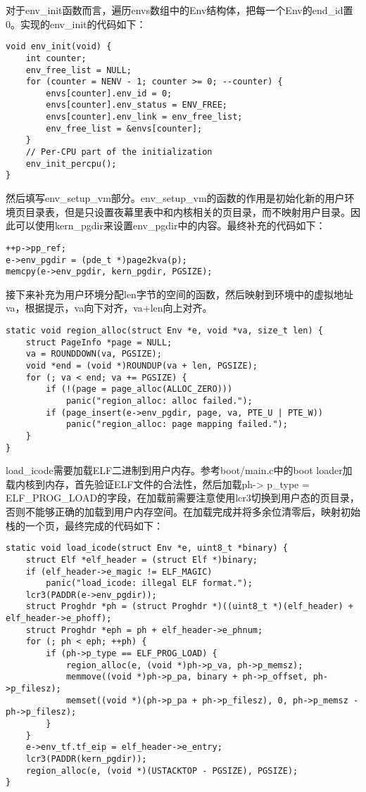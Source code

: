 \begin{exerciseSolution}{2}
    \par 对于env\_init函数而言，遍历envs数组中的Env结构体，把每一个Env的end\_id置0。实现的env\_init的代码如下：
    \begin{lstlisting}
void env_init(void) {
    int counter;
    env_free_list = NULL;
    for (counter = NENV - 1; counter >= 0; --counter) {
        envs[counter].env_id = 0;
        envs[counter].env_status = ENV_FREE;
        envs[counter].env_link = env_free_list;
        env_free_list = &envs[counter];
    }
    // Per-CPU part of the initialization
    env_init_percpu();
}
    \end{lstlisting}

    \par 然后填写env\_setup\_vm部分。env\_setup\_vm的函数的作用是初始化新的用户环境页目录表，但是只设置夜幕里表中和内核相关的页目录，而不映射用户目录。因此可以使用kern\_pgdir来设置env\_pgdir中的内容。最终补充的代码如下：
    \begin{lstlisting}
++p->pp_ref;
e->env_pgdir = (pde_t *)page2kva(p);
memcpy(e->env_pgdir, kern_pgdir, PGSIZE);
    \end{lstlisting}

    \par 接下来补充为用户环境分配len字节的空间的函数，然后映射到环境中的虚拟地址va，根据提示，va向下对齐，va+len向上对齐。
    \begin{lstlisting}
static void region_alloc(struct Env *e, void *va, size_t len) {
    struct PageInfo *page = NULL;
    va = ROUNDDOWN(va, PGSIZE);
    void *end = (void *)ROUNDUP(va + len, PGSIZE);
    for (; va < end; va += PGSIZE) {
        if (!(page = page_alloc(ALLOC_ZERO)))
            panic("region_alloc: alloc failed.");
        if (page_insert(e->env_pgdir, page, va, PTE_U | PTE_W))
            panic("region_alloc: page mapping failed.");
    }
}
    \end{lstlisting}

    \par load\_icode需要加载ELF二进制到用户内存。参考boot/main.c中的boot loader加载内核到内存，首先验证ELF文件的合法性，然后加载ph->
p\_type = ELF\_PROG\_LOAD的字段，在加载前需要注意使用lcr3切换到用户态的页目录，否则不能够正确的加载到用户内存空间。在加载完成并将多余位清零后，映射初始栈的一个页，最终完成的代码如下：
    \begin{lstlisting}
static void load_icode(struct Env *e, uint8_t *binary) {
    struct Elf *elf_header = (struct Elf *)binary;
    if (elf_header->e_magic != ELF_MAGIC)
        panic("load_icode: illegal ELF format.");
    lcr3(PADDR(e->env_pgdir));
    struct Proghdr *ph = (struct Proghdr *)((uint8_t *)(elf_header) + elf_header->e_phoff);
    struct Proghdr *eph = ph + elf_header->e_phnum;
    for (; ph < eph; ++ph) {
        if (ph->p_type == ELF_PROG_LOAD) {
            region_alloc(e, (void *)ph->p_va, ph->p_memsz);
            memmove((void *)ph->p_pa, binary + ph->p_offset, ph->p_filesz);
            memset((void *)(ph->p_pa + ph->p_filesz), 0, ph->p_memsz - ph->p_filesz);
        }
    }
    e->env_tf.tf_eip = elf_header->e_entry;
    lcr3(PADDR(kern_pgdir));
    region_alloc(e, (void *)(USTACKTOP - PGSIZE), PGSIZE);
}
    \end{lstlisting}


\end{exerciseSolution}

